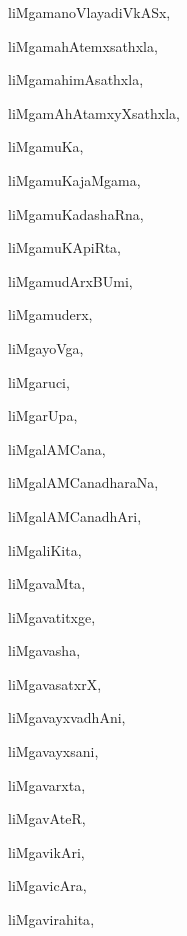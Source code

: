 \begin{multicols}{3}
{\noindent
{liMgamanoVlayadiVkASx}, \pageref{liMgamanoVlayadiVkASx}

\noindent
{liMgamahAtemxsathxla}, \pageref{liMgamahAtemxsathxla}

\noindent
{liMgamahimAsathxla}, \pageref{liMgamahimAsathxla}

\noindent
{liMgamAhAtamxyXsathxla}, \pageref{liMgamAhAtamxyXsathxla}

\noindent
{liMgamuKa}, \pageref{liMgamuKa}

\noindent
{liMgamuKajaMgama}, \pageref{liMgamuKajaMgama}

\noindent
{liMgamuKadashaRna}, \pageref{liMgamuKadashaRna}

\noindent
{liMgamuKApiRta}, \pageref{liMgamuKApiRta}

\noindent
{liMgamudArxBUmi}, \pageref{liMgamudArxBUmi}

\noindent
{liMgamuderx}, \pageref{liMgamuderx}

\noindent
{liMgayoVga}, \pageref{liMgayoVga}

\noindent
{liMgaruci}, \pageref{liMgaruci}

\noindent
{liMgarUpa}, \pageref{liMgarUpa}

\noindent
{liMgalAMCana}, \pageref{liMgalAMCana}

\noindent
{liMgalAMCanadharaNa}, \pageref{liMgalAMCanadharaNa}

\noindent
{liMgalAMCanadhAri}, \pageref{liMgalAMCanadhAri}

\noindent
{liMgaliKita}, \pageref{liMgaliKita}

\noindent
{liMgavaMta}, \pageref{liMgavaMta}

\noindent
{liMgavatitxge}, \pageref{liMgavatitxge}

\noindent
{liMgavasha}, \pageref{liMgavasha}

\noindent
{liMgavasatxrX}, \pageref{liMgavasatxrX}

\noindent
{liMgavayxvadhAni}, \pageref{liMgavayxvadhAni}

\noindent
{liMgavayxsani}, \pageref{liMgavayxsani}

\noindent
{liMgavarxta}, \pageref{liMgavarxta}

\noindent
{liMgavAteR}, \pageref{liMgavAteR}

\noindent
{liMgavikAri}, \pageref{liMgavikAri}

\noindent
{liMgavicAra}, \pageref{liMgavicAra}

\noindent
{liMgavirahita}, \pageref{liMgavirahita}

}
\end{multicols}
